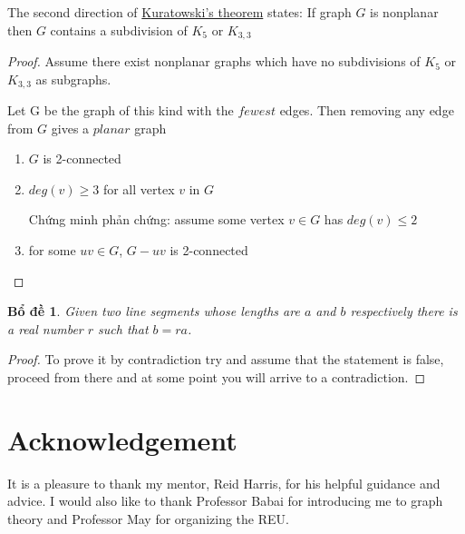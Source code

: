 \documentclass[12pt]{article}
\newtheorem{lemma}{Bổ đề}
\begin{document}
The second direction of \hyperref[thr:kuratowski]{Kuratowski's theorem} states: If graph $G$ is nonplanar then $G$ contains a subdivision of $K_5$ or $K_{3,3}$
\begin{proof}
    Assume there exist nonplanar graphs which have no subdivisions of $K_5$ or $K_{3,3}$ as subgraphs.

    Let G be the graph of this kind with the $fewest$ edges. Then removing any edge from $G$ gives a $planar$ graph

    \begin{enumerate}
        \item $G$ is 2-connected
              \begin{multicols}{2}
              \end{multicols}
        \item $deg(v) \geq 3$ for all vertex $v$ in $G$

              Chứng minh phản chứng: assume some vertex $v \in G$ has $deg(v) \leq 2$

        \item for some $uv \in G$, $G - uv$ is 2-connected
    \end{enumerate}

\end{proof}

\begin{lemma}
    Given two line segments whose lengths are $a$ and $b$ respectively there
    is a real number $r$ such that $b=ra$.
\end{lemma}

\begin{proof}
    To prove it by contradiction try and assume that the statement is false,
    proceed from there and at some point you will arrive to a contradiction.
\end{proof}

\section*{Acknowledgement}
It is a pleasure to thank my mentor, Reid Harris, for his helpful guidance and advice. I would also like to thank Professor Babai for introducing me to graph theory and Professor May for organizing the REU.
\end{document}

